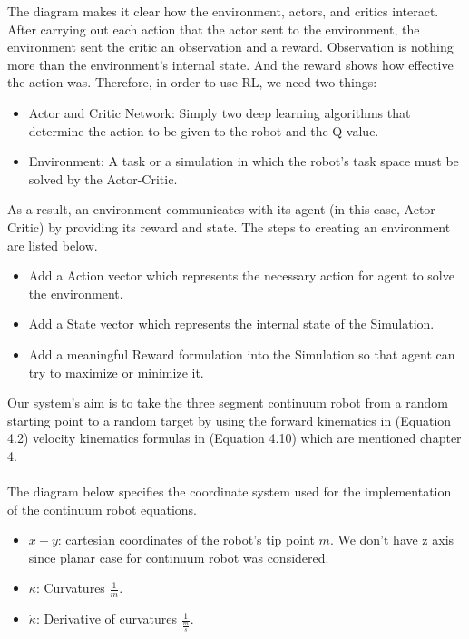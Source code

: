 \documentclass[12pt,twoside,a4]{mwbk}
\begin{document}
\noindent The diagram makes it clear how the environment, actors, and critics interact. After carrying out each action that the actor sent to the environment, the environment sent the critic an observation and a reward. Observation is nothing more than the environment's internal state. And the reward shows how effective the action was. Therefore, in order to use RL, we need two things:
\begin{itemize}
\item Actor and Critic Network: Simply two deep learning algorithms that determine the action to be given to the robot and the Q value.
\item Environment: A task or a simulation in which the robot's task space must be solved by the Actor-Critic.
\end{itemize}
As a result, an environment communicates with its agent (in this case, Actor-Critic) by providing its reward and state. The steps to creating an environment are listed below.
\begin{itemize}
\item Add a Action vector which represents the necessary action for agent to solve the environment.
\item Add a State vector which represents the internal state of the Simulation.
\item Add a meaningful Reward formulation into the Simulation so that agent can try to maximize or minimize it.
\end{itemize}

\noindent Our system's aim is to take the three segment continuum robot from a random starting point to a random target by using  the forward kinematics in (Equation 4.2) velocity kinematics formulas in (Equation 4.10) which are mentioned chapter 4.
\\ \\
The diagram below specifies the coordinate system used for the implementation of the continuum robot equations.
\begin{itemize}
    \item \textbf{$x-y$}: cartesian coordinates of the robot's tip point $m$. We don't have z axis since planar case for continuum robot was considered.
    \item \textbf{$\kappa$}: Curvatures  $\frac{1}{m}$.
    \item \textbf{$\dot{\kappa}$}: Derivative of curvatures $\frac{1}{\frac{m}{s}}$.
\end{itemize}
\newpage
\end{document}
